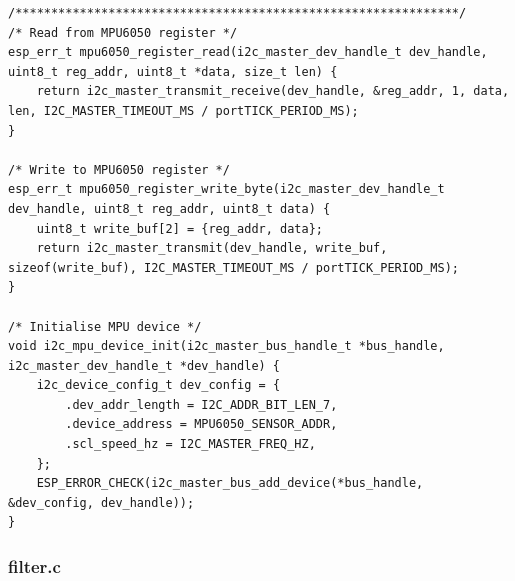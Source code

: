 \begin{lstlisting}
/**************************************************************/
/* Read from MPU6050 register */
esp_err_t mpu6050_register_read(i2c_master_dev_handle_t dev_handle, uint8_t reg_addr, uint8_t *data, size_t len) {
    return i2c_master_transmit_receive(dev_handle, &reg_addr, 1, data, len, I2C_MASTER_TIMEOUT_MS / portTICK_PERIOD_MS);
}

/* Write to MPU6050 register */
esp_err_t mpu6050_register_write_byte(i2c_master_dev_handle_t dev_handle, uint8_t reg_addr, uint8_t data) {
    uint8_t write_buf[2] = {reg_addr, data};
    return i2c_master_transmit(dev_handle, write_buf, sizeof(write_buf), I2C_MASTER_TIMEOUT_MS / portTICK_PERIOD_MS);
}

/* Initialise MPU device */
void i2c_mpu_device_init(i2c_master_bus_handle_t *bus_handle, i2c_master_dev_handle_t *dev_handle) {
    i2c_device_config_t dev_config = {
        .dev_addr_length = I2C_ADDR_BIT_LEN_7,
        .device_address = MPU6050_SENSOR_ADDR,
        .scl_speed_hz = I2C_MASTER_FREQ_HZ,
    };
    ESP_ERROR_CHECK(i2c_master_bus_add_device(*bus_handle, &dev_config, dev_handle));
}
\end{lstlisting}

\pagebreak
\subsubsection{filter.c}
\label{app:code-filter}

